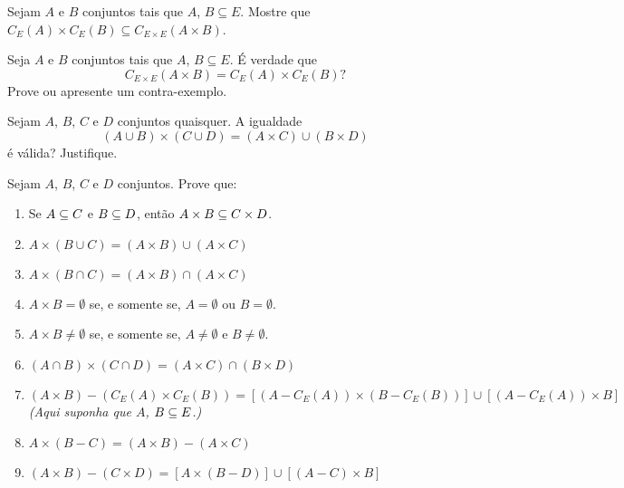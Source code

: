 \documentclass[12pt]{exam}
\begin{document}
    \questao{} Sejam $A$ e $B$ conjuntos tais que $A$, $B \subseteq E$. Mostre que $C_E(A) \times C_E(B) \subseteq C_{E \times E}(A \times B)$.

    \vspace{.3cm}

    \questao{} Seja $A$ e $B$ conjuntos tais que $A$, $B \subseteq E$. É verdade que
    \[
        C_{E\times E}(A \times B) = C_E(A) \times C_E(B)?
    \]
    Prove ou apresente um contra-exemplo.

    \vspace{.3cm}

    \questao{} Sejam $A$, $B$, $C$ e $D$ conjuntos quaisquer. A igualdade
    \[
        (A \cup B) \times (C \cup D) = (A \times C) \cup (B \times D)
    \]
    é válida? Justifique.

    \vspace{.3cm}

    \questao{} Sejam $A$, $B$, $C$ e $D$ conjuntos. Prove que:
    \begin{enumerate}[label={\alph*})]
        \item Se $A \subseteq C$ e $B \subseteq D$, ent\~ao $A \times B \subseteq C \times D$.

        \item $A \times (B \cup C) = (A \times B) \cup (A \times C)$

        \item $A \times (B \cap C) = (A \times B) \cap (A \times C)$

        \item $A \times B = \emptyset$ se, e somente se, $A = \emptyset$ ou $B = \emptyset$.

        \item $A \times B \ne \emptyset$ se, e somente se, $A \ne \emptyset$ e $B \ne \emptyset$.

        \item $(A \cap B) \times (C \cap D) = (A \times C) \cap (B \times D)$

        \item $(A \times B) - (C_E(A) \times C_E(B)) = [(A - C_E(A)) \times (B - C_E(B))] \cup [(A - C_E(A)) \times B]$  \textit{(Aqui suponha que $A$, $B \subseteq E$.)}

        \item $A \times (B - C) = (A \times B) - (A \times C)$

        \item $(A \times B) - (C \times D) = [A \times (B - D)] \cup [(A - C) \times B]$
    \end{enumerate}
\end{document}
